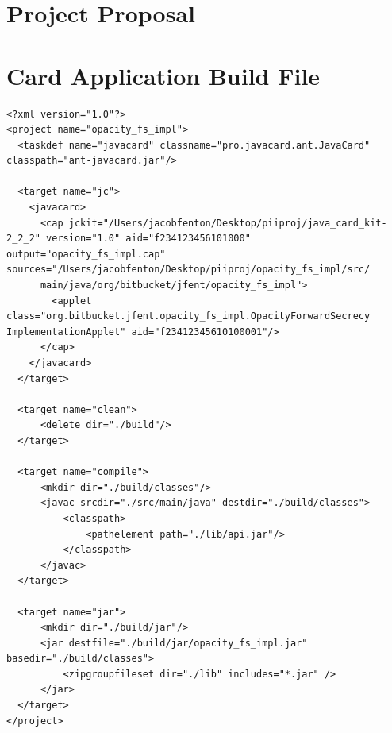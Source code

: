 \documentclass[12pt,a4paper,twoside,openright]{report}
\begin{document}


\appendix

\chapter{Project Proposal}
\label{appendix:proposal}



\chapter{Card Application Build File}
\label{appendix:cardappbuildfile}

\begin{verbatim}
<?xml version="1.0"?>
<project name="opacity_fs_impl">
  <taskdef name="javacard" classname="pro.javacard.ant.JavaCard" classpath="ant-javacard.jar"/>

  <target name="jc">
    <javacard>
      <cap jckit="/Users/jacobfenton/Desktop/piiproj/java_card_kit-2_2_2" version="1.0" aid="f234123456101000" output="opacity_fs_impl.cap" sources="/Users/jacobfenton/Desktop/piiproj/opacity_fs_impl/src/
      main/java/org/bitbucket/jfent/opacity_fs_impl">
        <applet class="org.bitbucket.jfent.opacity_fs_impl.OpacityForwardSecrecy ImplementationApplet" aid="f23412345610100001"/>
      </cap>
    </javacard>
  </target>

  <target name="clean">
      <delete dir="./build"/>
  </target>

  <target name="compile">
      <mkdir dir="./build/classes"/>
      <javac srcdir="./src/main/java" destdir="./build/classes">
          <classpath>
              <pathelement path="./lib/api.jar"/>
          </classpath>
      </javac>
  </target>

  <target name="jar">
      <mkdir dir="./build/jar"/>
      <jar destfile="./build/jar/opacity_fs_impl.jar" basedir="./build/classes">
          <zipgroupfileset dir="./lib" includes="*.jar" />
      </jar>
  </target>
</project>
\end{verbatim}
\end{document}
